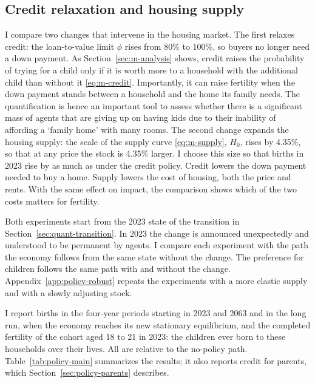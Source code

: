 \subsection{Credit relaxation and housing supply}
\label{sec:policy-design}

I compare two changes that intervene in the housing market. The first relaxes
credit: the loan-to-value limit $\phi$ rises from 80\% to 100\%, so buyers no
longer need a down payment. As Section~\ref{sec:m-analysis} shows, credit
raises the probability of trying for a child only if it is worth more to a
household with the additional child than without it \eqref{eq:m-credit}. Importantly, it
can raise fertility when the down payment stands between a household and the
home its family needs. The quantification is hence an important tool to assess whether there is a significant mass of agents that are giving up on having kids due to their inability of affording a `family home' with many rooms. The second change expands the housing supply: the scale of
the supply curve \eqref{eq:m-supply}, $H_0$, rises by 4.35\%, so that at any price the stock
is 4.35\% larger. I choose this size so that births in 2023 rise by as
much as under the credit policy. Credit lowers the down payment needed to buy a home.
Supply lowers the cost of housing, both the price and rents. With the same
effect on impact, the comparison shows which of the two costs matters for
fertility.

Both experiments start from the 2023 state of the transition in
Section~\ref{sec:quant-transition}. In 2023 the change is announced unexpectedly and
understood to be permanent by agents. I compare each experiment with the path the economy follows from
the same state without the change. The preference for children follows the
same path with and without the change. Appendix~\ref{app:policy-robust} repeats the
experiments with a more elastic supply and with a slowly adjusting stock.

I report births in the four-year periods starting in 2023 and 2063 and in the
long run, when the economy reaches its new stationary equilibrium, and the
completed fertility of the cohort aged 18 to 21 in 2023: the children ever
born to these households over their lives. All are relative to the no-policy
path. Table~\ref{tab:policy-main} summarizes the results; it also reports
credit for parents, which Section~\ref{sec:policy-parents} describes.

